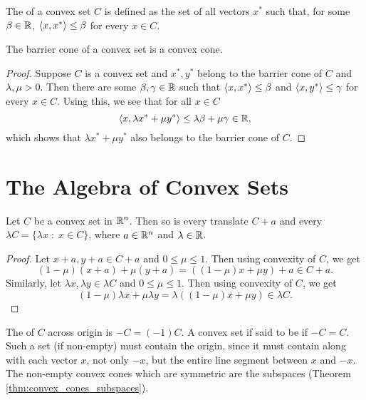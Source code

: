 \documentclass[11pt,a4paper]{article}
\begin{document}
\begin{definition}
    The  of a convex set $C$ is defined as the set of all vectors $x^*$ such that, for some $\beta\in\mathbb{R}$, $\langle x, x^* \rangle\le \beta$ for every $x\in C$.
\end{definition}

\begin{proposition}
    The barrier cone of a convex set is a convex cone.
\end{proposition}

\begin{proof}
    Suppose $C$ is a convex set and $x^*,y^*$ belong to the barrier cone of $C$ and $\lambda,\mu>0$. Then there are some $\beta,\gamma\in \mathbb{R}$ such that $\langle x, x^* \rangle\le \beta$ and $\langle x, y^* \rangle\le \gamma$ for every $x\in C$. Using this, we see that for all $x\in C$
    \begin{equation*}
        \langle x, \lambda x^*+\mu y^* \rangle\le \lambda \beta + \mu \gamma \in \mathbb{R},
    \end{equation*}
    which shows that $\lambda x^*+\mu y^*$ also belongs to the barrier cone of $C$.
\end{proof}

\section{The Algebra of Convex Sets}

\begin{theorem}
    Let $C$ be a convex set in $\mathbb{R}^n$. Then so is every translate $C+a$ and every  $\lambda C = \{\lambda x\;:\; x\in C\}$, where $a\in \mathbb{R}^n$ and $\lambda \in \mathbb{R}$.
\end{theorem}

\begin{proof}
    Let $x+a,y+a\in C+a$ and $0\le \mu\le 1$. Then using convexity of $C$, we get
    \begin{equation*}
        (1-\mu) (x+a) + \mu (y+a) = ((1-\mu) x + \mu y) + a\in C+a.
    \end{equation*}
    Similarly, let $\lambda x,\lambda y\in \lambda C$ and $0\le \mu\le 1$. Then using convexity of $C$, we get
    \begin{equation*}
        (1-\mu) \lambda x + \mu \lambda y = \lambda ((1-\mu) x + \mu y) \in \lambda C.
    \end{equation*}
\end{proof}

\begin{remark}
    The  of $C$ across origin is $-C = (-1)C.$ A convex set if said to be  if $-C = C$. Such a set (if non-empty) must contain the origin, since it must contain along with each vector $x$, not only $-x$, but the entire line segment between $x$ and $-x$. The non-empty convex cones which are symmetric are the subspaces (Theorem \ref{thm:convex_cones_subspaces}).
\end{remark}
\end{document}
